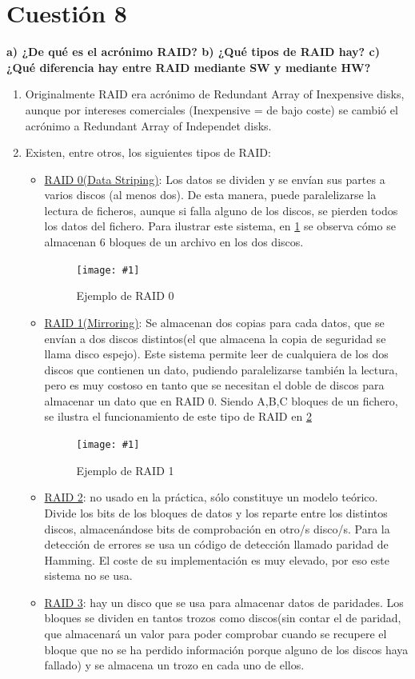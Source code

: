\documentclass[a4paper,11pt]{article}
\newenvironment{answer}{%
\begin{list}{}{%
\addtolength{\hoffset}{0cm}
}%
\item[]}{\end{list}}
\newcommand{\imagen}[3]{
  \begin{figure}[H]
    \begin{center}
    \texttt{[image: \#1]}
    \end{center}
    \caption{#2}
    \label{#3}
  \end{figure}
}
\begin{document}
\section{Cuestión 8}
\textbf{a) ¿De qué es el acrónimo RAID? b) ¿Qué tipos de RAID hay? c) ¿Qué diferencia hay entre RAID mediante SW y 
mediante HW?}
\begin{answer}
\begin{enumerate}[label=\alph*.]
\item Originalmente RAID era acrónimo de Redundant Array of Inexpensive disks, aunque por intereses comerciales
(Inexpensive = de bajo coste) se cambió el acrónimo a Redundant Array of Independet disks.
\item Existen, entre otros, los siguientes tipos de RAID: \cite{raid} \cite{imgsraid}
  \begin{itemize}
    \item \underline{RAID 0(Data Striping)}: Los datos se dividen y se envían sus partes a varios discos (al menos dos). De esta manera, puede paralelizarse
    la lectura de ficheros, aunque si falla alguno de los discos, se pierden todos los datos del fichero. Para ilustrar
    este sistema, en \ref{raid0} se observa cómo se almacenan 6 bloques de un archivo en los dos discos.
    \imagen{raid-0.png}{Ejemplo de RAID 0}{raid0}
    
    \item \underline{RAID 1(Mirroring)}: Se almacenan dos copias para cada datos, que se envían a dos discos distintos(el que almacena
    la copia de seguridad se llama disco espejo). Este sistema permite leer de cualquiera de los dos discos que contienen
    un dato, pudiendo paralelizarse también la lectura, pero es muy costoso en tanto que se necesitan el doble de discos
    para almacenar un dato que en RAID 0. Siendo A,B,C bloques de un fichero, se ilustra el funcionamiento de este
    tipo de RAID en \ref{raid1}
    \imagen{raid-1.png}{Ejemplo de RAID 1}{raid1}
    \item \underline{RAID 2}: no usado en la práctica, sólo constituye un modelo teórico. Divide los bits de los bloques de datos y
    los reparte entre los distintos discos, almacenándose bits de comprobación en otro/s disco/s. Para la detección de errores
    se usa un código de detección llamado paridad de Hamming. El coste de su implementación es muy elevado, por eso este sistema
    no se usa.
    
    \item \underline{RAID 3}: hay un disco que se usa para almacenar datos de paridades. Los bloques se dividen en tantos trozos
    como discos(sin contar el de paridad, que almacenará un valor para poder comprobar cuando se recupere el bloque que 
    no se ha perdido información porque alguno de los discos haya fallado) y se almacena un trozo en cada uno de ellos.
    

\end{itemize}
\end{enumerate}
\end{answer}
\end{document}

